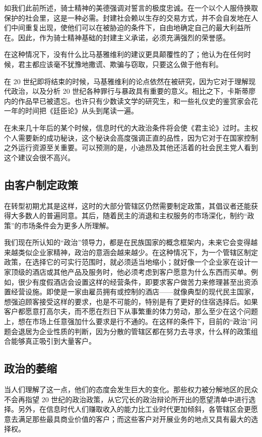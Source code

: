 如我们此前所述，骑士精神的美德强调对誓言的极度忠诚。在一个以个人服侍换取保护的社会里，这是一种必需。封建社会赖以生存的交易方式，并不会自发地在人们中间重复出现，使他们可以在被胁迫的条件下，自由地确定自己的最大利益所在。因此，作为骑士精神基础的封建主义承诺，必须充满强烈的荣誉感。

在这种情况下，没有什么比马基雅维利的建议更具颠覆性的了；他认为在任何时候，君主都应该毫不犹豫地撒谎、欺骗与窃取，只要这么做于他有利。

在 20 世纪即将结束的时候，马基雅维利的论点依然在被研究，因为它对于理解现代政治，以及分析 20 世纪各种罪行与暴政具有重要的意义。相比之下，卡斯蒂廖内的作品早已被遗忘。也许只有少数读文学的研究生，和一些礼仪史的鉴赏家会花一年的时间把《廷臣论》从头到尾读一遍。

在未来几十年后的某个时候，信息时代的大政治条件将会使《君主论》过时。主权个人需要新的成功秘诀，这个秘诀会高度强调正直的品性，因为它对于在国家控制之外运行资源至关重要。可以预测的是，小迪昂及其他还活着的社会民主党人看到这个建议会很不高兴。

\subsection{由客户制定政策}
在转型初期尤其是这样，这时的大部分管辖区仍然需要制定政策，其倡议者还能获得大多数人的普遍同意。其后，随着民主的消退和主权服务的市场深化，制约“政策”的市场条件会为更多人所理解。

我们现在所认知的“政治”领导力，都是在民族国家的概念框架内，未来它会变得越来越类似企业家精神，政治的意涵会越来越少。在这种情况下，为一个管辖区制定政策，在选择它的可实行范围时，就必须适当地缩小；就好像一个企业家在设计一家顶级的酒店或其他产品及服务时，他必须考虑到客户愿意为什么东西而买单。例如，很少有度假酒店会设置这样的经营条件，即要求客户做苦力来修理甚至出资添置经营设施。即使是一家由雇员拥有或控制的酒店——就像典型的现代民主国家，想强迫顾客接受这样的要求，也是不可能的，特别是有了更好的住宿选择后。如果客户都愿意打高尔夫，而不愿在烈日下从事繁重的体力劳动，那么至少在这个问题上，想在市场上任意强加什么要求是行不通的。在这样的条件下，目前的“政治”问题会退居为企业性质的判断，因为分散的管辖区都在努力去寻求，什么样的政策组合能够真正吸引到大量客户。

\subsection{政治的萎缩}
当人们理解了这一点，他们的态度会发生巨大的变化。那些权力被分解地区的民众不会再指望 20 世纪的政治政策，从它冗长的政治辩论所开出的愿望清单中进行选择。另外，在信息时代人们赚取收入的能力比工业时代更加倾斜，各管辖区会更愿意去满足那些最具商业价值的客户；而这些客户对开展业务的地点又具有最大的选择权。

